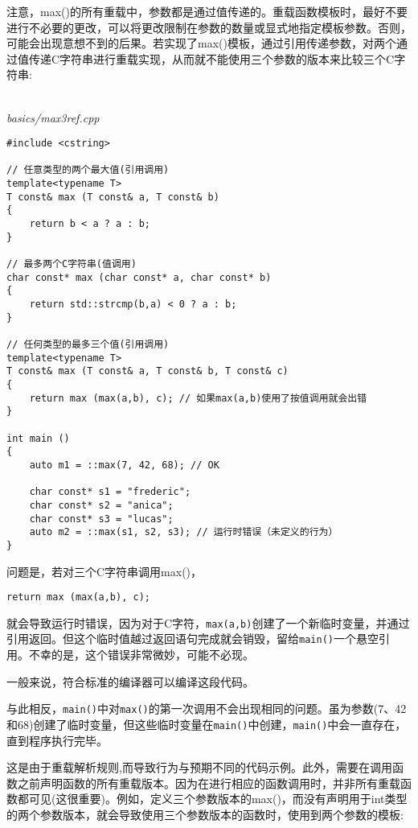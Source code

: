 注意，max()的所有重载中，参数都是通过值传递的。重载函数模板时，最好不要进行不必要的更改，可以将更改限制在参数的数量或显式地指定模板参数。否则，可能会出现意想不到的后果。若实现了max()模板，通过引用传递参数，对两个通过值传递C字符串进行重载实现，从而就不能使用三个参数的版本来比较三个C字符串:

\hspace*{\fill} \\ %
\noindent
\textit{basics/max3ref.cpp}
\begin{lstlisting}[style=styleCXX]
#include <cstring>

// 任意类型的两个最大值(引用调用)
template<typename T>
T const& max (T const& a, T const& b)
{
	return b < a ? a : b;
}

// 最多两个C字符串(值调用)
char const* max (char const* a, char const* b)
{
	return std::strcmp(b,a) < 0 ? a : b;
}

// 任何类型的最多三个值(引用调用)
template<typename T>
T const& max (T const& a, T const& b, T const& c)
{
	return max (max(a,b), c); // 如果max(a,b)使用了按值调用就会出错
}

int main ()
{
	auto m1 = ::max(7, 42, 68); // OK
	
	char const* s1 = "frederic";
	char const* s2 = "anica";
	char const* s3 = "lucas";
	auto m2 = ::max(s1, s2, s3); // 运行时错误（未定义的行为）
}
\end{lstlisting}

问题是，若对三个C字符串调用max()，

\begin{lstlisting}[style=styleCXX]
return max (max(a,b), c);
\end{lstlisting}

就会导致运行时错误，因为对于C字符，\texttt{max(a,b)}创建了一个新临时变量，并通过引用返回。但这个临时值越过返回语句完成就会销毁，留给\texttt{main()}一个悬空引用。不幸的是，这个错误非常微妙，可能不必现。

\begin{tcolorbox}[colback=webgreen!5!white,colframe=webgreen!75!black]
\hspace*{0.75cm}一般来说，符合标准的编译器可以编译这段代码。
\end{tcolorbox}

与此相反，\texttt{main()}中对\texttt{max()}的第一次调用不会出现相同的问题。虽为参数(7、42和68)创建了临时变量，但这些临时变量在\texttt{main()}中创建，\texttt{main()}中会一直存在，直到程序执行完毕。

这是由于重载解析规则,而导致行为与预期不同的代码示例。此外，需要在调用函数之前声明函数的所有重载版本。因为在进行相应的函数调用时，并非所有重载函数都可见(这很重要)。例如，定义三个参数版本的max()，而没有声明用于int类型的两个参数版本，就会导致使用三个参数版本的函数时，使用到两个参数的模板:

